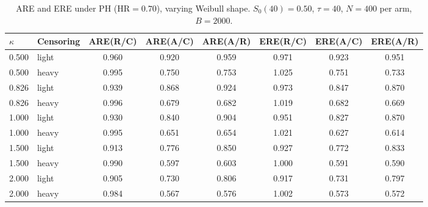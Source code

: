 \begin{table}[ht]
\centering
\small
\caption{ARE and ERE under PH (HR$=0.70$), varying Weibull shape.
  $S_0(40)=0.50$, $\tau=40$, $N=400$ per arm, $B=2000$.}
\label{tab:main-sim-ph-hr070-kappa-050-200-light-heavy}
\setlength{\tabcolsep}{4pt}
\begin{tabular}{llcccccc}
\hline
$\kappa$ & Censoring & ARE(R/C) & ARE(A/C) & ARE(A/R) & ERE(R/C) & ERE(A/C) & ERE(A/R) \\
\hline
0.500 & light & 0.960 & 0.920 & 0.959 & 0.971 & 0.923 & 0.951 \\
0.500 & heavy & 0.995 & 0.750 & 0.753 & 1.025 & 0.751 & 0.733 \\
0.826 & light & 0.939 & 0.868 & 0.924 & 0.973 & 0.847 & 0.870 \\
0.826 & heavy & 0.996 & 0.679 & 0.682 & 1.019 & 0.682 & 0.669 \\
1.000 & light & 0.930 & 0.840 & 0.904 & 0.951 & 0.827 & 0.870 \\
1.000 & heavy & 0.995 & 0.651 & 0.654 & 1.021 & 0.627 & 0.614 \\
1.500 & light & 0.913 & 0.776 & 0.850 & 0.927 & 0.772 & 0.833 \\
1.500 & heavy & 0.990 & 0.597 & 0.603 & 1.000 & 0.591 & 0.590 \\
2.000 & light & 0.905 & 0.730 & 0.806 & 0.917 & 0.731 & 0.797 \\
2.000 & heavy & 0.984 & 0.567 & 0.576 & 1.002 & 0.573 & 0.572 \\
\hline
\end{tabular}
\end{table}
